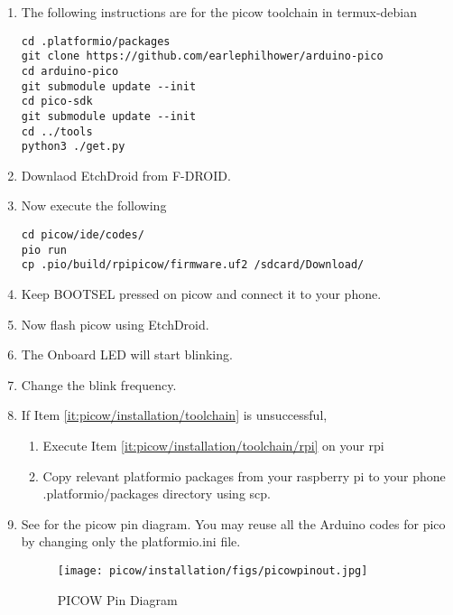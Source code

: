 \begin{enumerate}[label=\arabic*.,ref=\theenumi]
	\item The following instructions are for the picow toolchain
		in termux-debian
		\label{it:picow/installation/toolchain}
\begin{lstlisting}
cd .platformio/packages
git clone https://github.com/earlephilhower/arduino-pico
cd arduino-pico
git submodule update --init
cd pico-sdk
git submodule update --init
cd ../tools
python3 ./get.py
\end{lstlisting}
\item Downlaod EtchDroid from F-DROID. 
\item Now execute the following 
\label{it:picow/installation/toolchain/rpi}
\begin{lstlisting}
cd picow/ide/codes/
pio run
cp .pio/build/rpipicow/firmware.uf2 /sdcard/Download/
\end{lstlisting}
\item  Keep BOOTSEL pressed on picow  and connect it to your phone.
\item Now flash picow using EtchDroid.
\item The Onboard LED will start blinking.
\item Change the blink frequency.
\item If Item \ref{it:picow/installation/toolchain} is unsuccessful, 
\begin{enumerate}
	\item
		Execute Item
\ref{it:picow/installation/toolchain/rpi}
on your rpi
	\item Copy relevant platformio packages from your raspberry pi to your phone .platformio/packages directory using scp.
\end{enumerate}
\item 
	See
			 for the picow pin diagram.
			You may reuse all the Arduino codes for pico by changing only the platformio.ini file.
		\begin{figure}
			\centering
    \texttt{[image: picow/installation/figs/picowpinout.jpg]}
    \caption{PICOW Pin Diagram} %
			\label{fig:picowpinout}
		\end{figure}
\end{enumerate}

